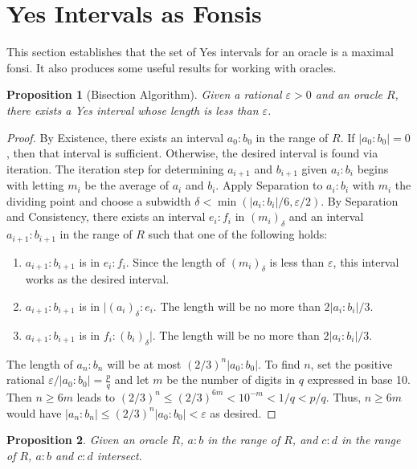 \documentclass[12pt]{article}
\newtheorem{proposition}{Proposition}[section]
\begin{document}
\section{Yes Intervals as Fonsis}

This section establishes that the set of Yes intervals for an oracle is a maximal fonsi. It also produces some useful results for working with oracles. 


\begin{proposition}[Bisection Algorithm]
    Given a rational $\varepsilon >0$ and an oracle $R$, there exists a Yes interval whose length is less than $\varepsilon$.
\end{proposition}

\begin{proof}
    By Existence, there exists an interval $a_0:b_0$ in the range of $R$. If $|a_0:b_0| = 0$, then that interval is sufficient. Otherwise, the desired interval is found via iteration. The iteration step for determining $a_{i+1}$ and $b_{i+1}$ given $a_i:b_i$ begins with letting $m_i$ be the average of $a_i$ and $b_i$. Apply Separation to $a_i:b_i$ with $m_i$ the dividing point and choose a subwidth $\delta < \min(|a_i:b_i|/6, \varepsilon /2)$. By Separation and Consistency, there exists an interval $e_i:f_i$ in $(m_i)_\delta$ and an interval $a_{i+1}:b_{i+1}$ in the range of $R$ such that one of the following holds: 
    \begin{enumerate}
        \item $a_{i+1}:b_{i+1}$ is in $e_i:f_i$. Since the length of $(m_i)_\delta$ is less than $\varepsilon$, this interval works as the desired interval.  
        \item  $a_{i+1}:b_{i+1}$ is in $|(a_i)_\delta:e_i$. The length will be no more than $2|a_i:b_i|/3$.
        \item  $a_{i+1}:b_{i+1}$ is in $f_i:(b_i)_\delta|$. The length will be no more than $2|a_i:b_i|/3$.
    \end{enumerate}
    The length of $a_n:b_n$ will be at most $(2/3)^n |a_0:b_0|$. To find $n$, set the positive rational $\varepsilon/|a_0:b_0| = \frac{p}{q}$ and let $m$ be the number of digits in $q$ expressed in base 10. Then $n \geq  6m$ leads to  $(2/3)^n \leq (2/3)^{6m} < 10^{-m} < 1/q < p/q$. Thus, $n \geq 6m$ would have $|a_n:b_n| \leq (2/3)^n |a_0:b_0| < \varepsilon$ as desired. 
\end{proof}


\begin{proposition}
    Given an oracle $R$, $a:b$ in the range of $R$, and $c:d$ in the range of $R$, $a:b$ and $c:d$ intersect. 
\end{proposition}
\end{document}
